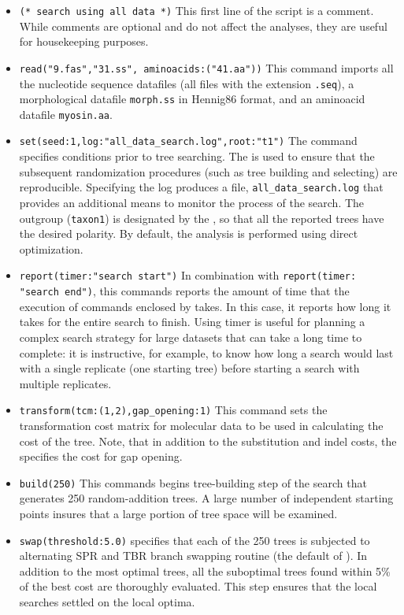 \begin{itemize}
\item \texttt{(* search using all data *)} This first line of the script is a comment. While comments are optional and do not affect the analyses, they are useful for housekeeping purposes.
\item \texttt{read("9.fas","31.ss", aminoacids:("41.aa"))}
This command imports all the nucleotide sequence datafiles (all files with the extension \texttt{.seq}), a morphological datafile \texttt{morph.ss} in Hennig86 format, and an aminoacid datafile \texttt{myosin.aa}.
\item \texttt{set(seed:1,log:"all\_data\_search.log",root:"t1")} The  command specifies conditions prior to tree searching. The  is used to ensure that the subsequent randomization procedures (such as tree building and selecting) are reproducible. Specifying the log produces a file, \texttt{all\_data\_search.log} that provides an additional means to monitor the process of the search. The outgroup (\texttt{taxon1}) is designated by the , so that all the reported trees have the desired polarity. By default, the analysis is performed using direct optimization.
\item \texttt{report(timer:"search start")} In combination with \texttt{report(timer:\\"search end")}, this commands reports the amount of time that the execution of commands enclosed by  takes. In this case, it reports how long it takes for the entire search to finish. Using timer is useful for planning a complex search strategy for large datasets that can take a long time to complete: it is instructive, for example, to know how long a search would last with a single replicate (one starting tree) before starting a search with multiple replicates.
\item \texttt{transform(tcm:(1,2),gap\_opening:1)} This command sets the \\transformation cost matrix for molecular data to be used in calculating the cost of the tree. Note, that in addition to the substitution and indel costs, the  specifies the cost for gap opening.
\item \texttt{build(250)} This commands begins tree-building step of the search that generates 250 random-addition trees. A large number of independent starting points insures that a large portion of tree space will be examined.
\item \texttt{swap(threshold:5.0)}  specifies that each of the 250 trees is subjected to alternating SPR and TBR branch swapping routine (the default of \poy). In addition to the most optimal trees, all the suboptimal trees found within 5\% of the best cost are thoroughly evaluated. This step ensures that the local searches settled on the local optima.

\end{itemize}
